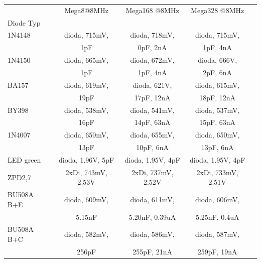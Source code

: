 \begin{table}[H]
  \begin{center}
    \begin{tabular}{| l | c | c | c | c |}
    \hline
           & Mega8@8MHz          & Mega168 @8MHz       & Mega328 @8MHz     \\
 Diode Typ &                     &                     &                   \\
    \hline
    \hline
1N4148     & dioda, 715mV,        & dioda, 718mV,            & dioda, 715mV,           \\
           &               1pF    &               0pF, 2nA   &               1pF, 4nA  \\
    \hline
1N4150     & dioda, 665mV,        & dioda, 672mV,            & dioda, 666V,           \\
           &               1pF    &               1pF, 4nA   &              2pF, 6nA  \\
    \hline
BA157      & dioda, 619mV,        & dioda, 621V,              & dioda, 615mV,            \\
           &               19pF   &              17pF, 12nA   &               18pF, 12nA \\
    \hline
BY398      & dioda, 538mV,        & dioda, 541mV,             & dioda, 537mV,            \\
           &               16pF   &               14pF, 63nA  &               15pF, 63nA \\
    \hline
1N4007     & dioda, 650mV,        & dioda, 655mV,            & dioda, 650mV,           \\
           &               13pF   &               10pF, 6nA  &               13pF, 6nA \\
    \hline
LED green  & dioda, 1.96V, 5pF    & dioda, 1.95V, 4pF   & dioda, 1.95V, 4pF \\
    \hline
ZPD2,7     & 2xDi, 743mV, 2.53V   & 2xDi, 737mV, 2.52V  & 2xDi, 733mV, 2.51V \\
    \hline
BU508A B+E & dioda, 609mV,        & dioda, 611mV,                & dioda, 606mV,              \\
           &               5.15nF &               5.20nF, 0.39uA &               5.25nF, 0.4uA\\
    \hline
BU508A B+C & dioda, 582mV,        & dioda, 586mV,             & dioda, 587mV,            \\
           &               256pF  &               255pF, 21nA &               259pF, 19nA\\

\end{tabular}
\end{center}
\end{table}
